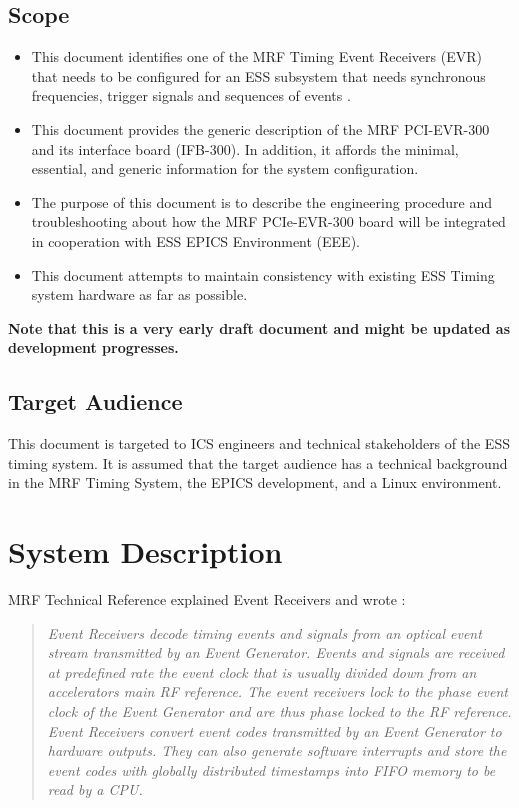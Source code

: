 \documentclass[11pt
  , a4paper
  , article
  , oneside
  , showtrims
]{memoir}
\begin{document}
\section{Scope}
\begin{itemize}
\item This document identifies one of the MRF Timing Event Receivers (EVR) that needs to be configured for an ESS subsystem that needs synchronous frequencies, trigger signals and sequences of events \cite{MRFEVENTSYSTEMDC}.
\item This document provides the generic description of the MRF PCI-EVR-300 and its interface board (IFB-300). In addition, it affords the minimal, essential, and generic information for the system configuration.  
\item The purpose of this document is to describe the engineering procedure and troubleshooting about how the MRF PCIe-EVR-300 board will be integrated in cooperation with ESS EPICS Environment (EEE).
\item This document attempts to maintain consistency with existing ESS Timing system hardware as far as possible. 
\end{itemize}
\textbf{Note that this is a very early draft document and might be updated as development progresses.}

\section{Target Audience}
This document is targeted to ICS engineers and technical stakeholders of the ESS timing system. It is assumed that the target audience has a technical background in the MRF Timing System, the EPICS development, and a Linux environment.

\chapter{System Description}
MRF Technical Reference \citep[see][p45]{MRFEVENTSYSTEMDC} explained Event Receivers and wrote :
\blockquote{\textit{Event Receivers decode timing events and signals from an optical event stream transmitted by an Event Generator. Events and signals are received at predefined rate the event clock that is usually divided down from an accelerators main RF reference. The event receivers lock to the phase event clock of the Event Generator and are thus phase locked to the RF reference. Event Receivers convert event codes transmitted by an Event Generator to hardware outputs. They can also generate software interrupts and store the event codes with globally distributed timestamps into FIFO memory to be read by a CPU.}}
\end{document}

